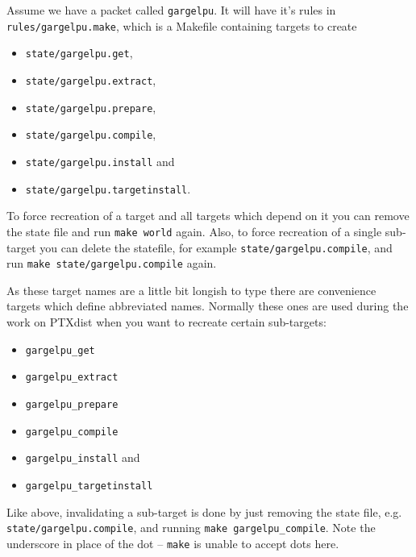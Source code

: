 Assume we have a packet called \texttt{gargelpu}. It will have it's
rules in \texttt{rules/gargelpu.make}, which is a Makefile containing
targets to create 
%
\begin{itemize}
\setlength{\itemsep}{0pt}
\item \texttt{state/gargelpu.get},
\item \texttt{state/gargelpu.extract},
\item \texttt{state/gargelpu.prepare},
\item \texttt{state/gargelpu.compile}, 
\item \texttt{state/gargelpu.install} and 
\item \texttt{state/gargelpu.targetinstall}.
\end{itemize}
%
To force recreation of a target and all targets which depend on it you
can remove the state file and run \texttt{make world} again. Also, to
force recreation of a single sub-target you can delete the statefile,
for example \texttt{state/gargelpu.compile}, and run \texttt{make
state/gargelpu.compile} again. 

As these target names are a little bit longish to type there are
convenience targets which define abbreviated names. Normally these ones
are used during the work on PTXdist when you want to recreate certain
sub-targets: 
%
\begin{itemize}
\setlength{\itemsep}{0pt}
\item \texttt{gargelpu\_get}
\item \texttt{gargelpu\_extract}
\item \texttt{gargelpu\_prepare}
\item \texttt{gargelpu\_compile}
\item \texttt{gargelpu\_install} and 
\item \texttt{gargelpu\_targetinstall}
\end{itemize}

Like above, invalidating a sub-target is done by just removing the state
file, e.g. \texttt{state/gargelpu.compile}, and running \texttt{make
gargelpu\_compile}. Note the underscore in place of the dot --
\texttt{make} is unable to accept dots here. 

